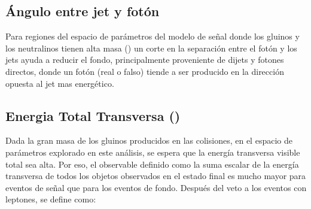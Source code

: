 \subsection{Ángulo entre jet y fotón}

Para regiones del espacio de parámetros del modelo de señal
donde los gluinos y los neutralinos tienen alta masa ({\SRH})
un corte en la separación entre el fotón y los jets ayuda a
reducir el fondo, principalmente proveniente de dijets y
fotones directos, donde un fotón (real o falso) tiende a ser
producido en la dirección opuesta al jet mas energético.


%



\subsection{Energia Total Transversa (\HT)}
\label{sec:ht_obj}

Dada la gran masa de los gluinos producidos en las colisiones, en el espacio de
parámetros explorado en este análisis, se espera que la energía transversa
visible total sea alta. Por eso, el observable {\HT} definido como la suma
escalar de la energía transversa de todos los objetos observados en el estado
final es mucho mayor para eventos de señal que para los eventos de fondo.
Después del veto a los eventos con leptones, {\HT} se define como:

